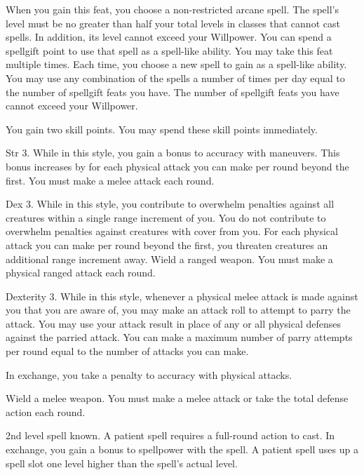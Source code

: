 When you gain this feat, you choose a non-restricted arcane spell.
The spell's level must be no greater than half your total levels in classes that cannot cast spells.
In addition, its level cannot exceed your Willpower.
You can spend a spellgift point to use that spell as a spell-like ability.
You may take this feat multiple times.
Each time, you choose a new spell to gain as a spell-like ability.
You may use any combination of the spells a number of times per day equal to the number of spellgift feats you have.
The number of spellgift feats you have cannot exceed your Willpower.

\featben You gain two skill points.
You may spend these skill points immediately.

\featpre Str 3.
\featben While in this style, you gain a  bonus to accuracy with maneuvers.
This bonus increases by  for each physical attack you can make per round beyond the first.
\stylereq You must make a melee attack each round.

\featpre Dex 3.
\featben While in this style, you contribute to overwhelm penalties against all creatures within a single range increment of you.
You do not contribute to overwhelm penalties against creatures with cover from you.
For each physical attack you can make per round beyond the first, you threaten creatures an additional range increment away.
\stylereq Wield a ranged weapon.
You must make a physical ranged attack each round.

\featpre Dexterity 3.
\featben While in this style, whenever a physical melee attack is made against you that you are aware of, you may make an attack roll to attempt to parry the attack.
You may use your attack result in place of any or all physical defenses against the parried attack.
You can make a maximum number of parry attempts per round equal to the number of attacks you can make.

In exchange, you take a  penalty to accuracy with physical attacks.

\stylereq Wield a melee weapon.
You must make a melee attack or take the total defense action each round.

\featpre 2nd level spell known.
\featben A patient spell requires a full-round action to cast.
In exchange, you gain a  bonus to spellpower with the spell.
A patient spell uses up a spell slot one level higher than the spell's actual level.

